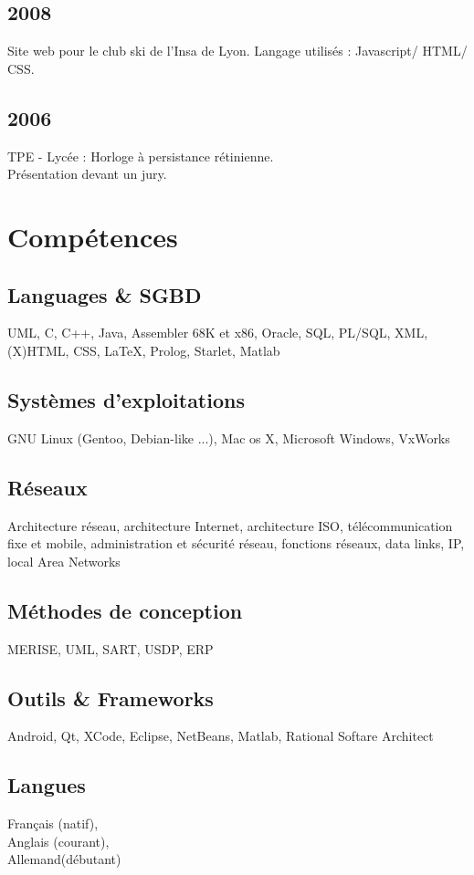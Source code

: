 	\subsection{2008}
		{Site web pour le club ski de l'Insa de Lyon. Langage utilisés : Javascript/ HTML/ CSS.}
				
	\subsection{2006}
		{TPE - Lycée : Horloge à persistance rétinienne.\\
		 Présentation devant un jury.}
		
\section{Compétences}
	\subsection{Languages \& SGBD}
		{UML, C, C++, Java, Assembler 68K et x86, Oracle, SQL, PL/SQL, XML, (X)HTML, CSS, \LaTeX, Prolog, Starlet, Matlab}
		
	\subsection{Systèmes d'exploitations}
		{GNU Linux (Gentoo, Debian-like ...), Mac os X, Microsoft Windows, VxWorks}
		
	\subsection{Réseaux}
		{Architecture réseau, architecture Internet, architecture ISO, télécommunication fixe et mobile, administration et sécurité réseau, fonctions réseaux, data links, IP, local Area Networks}

	\subsection{Méthodes de conception}
		{MERISE, UML, SART, USDP, ERP}
		
	\subsection{Outils \& Frameworks}
		{Android, Qt, XCode, Eclipse, NetBeans, Matlab, Rational Softare Architect}
		
	\subsection{Langues}
		{Français (natif),\\Anglais (courant),\\Allemand(débutant)}
				
